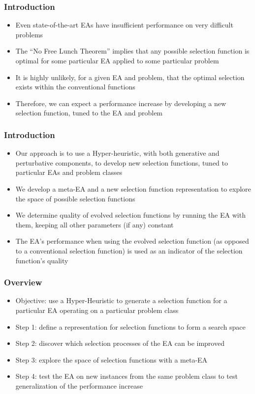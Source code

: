 \documentclass{beamer}
\begin{document}
	\begin{frame}
		\frametitle{Introduction}
		\begin{itemize}
			\item<1-|alert@1> Even state-of-the-art EAs have insufficient performance on very difficult problems
			\item<2-|alert@2> The ``No Free Lunch Theorem'' implies that any possible selection function is optimal for some particular EA applied to some particular problem
			\item<3-|alert@3> It is highly unlikely, for a given EA and problem, that the optimal selection exists within the conventional functions
			\item<4-|alert@4> Therefore, we can expect a performance increase by developing a new selection function, tuned to the EA and problem
		\end{itemize}
	\end{frame}	
	
	\begin{frame}
		\frametitle{Introduction}
		\begin{itemize}
			\item<1-|alert@1> Our approach is to use a Hyper-heuristic, with both generative and perturbative components, to develop new selection functions, tuned to particular EAs and problem classes
			\item<2-|alert@2> We develop a meta-EA and a new selection function representation to explore the space of possible selection functions
			\item<3-|alert@3> We determine quality of evolved selection functions by running the EA with them, keeping all other parameters (if any) constant
			\item<4-|alert@4> The EA's performance when using the evolved selection function (as opposed to a conventional selection function) is used as an indicator of the selection function's quality		
		\end{itemize}
	\end{frame}					
	
	
	
	\begin{frame}
		\frametitle{Overview}
		\begin{itemize}
			 \item<1-> Objective: use a Hyper-Heuristic to generate a selection function for a particular EA operating on a particular problem class
			 \item<2-|alert@2> Step 1: define a representation for selection functions to form a search space
			 \item<3-|alert@3> Step 2: discover which selection processes of the EA can be improved
			 \item<4-|alert@4> Step 3: explore the space of selection functions with a meta-EA
			 \item<5-|alert@5> Step 4: test the EA on new instances from the same problem class to test generalization of the performance increase
		\end{itemize}	
	\end{frame}	
	
\end{document}
